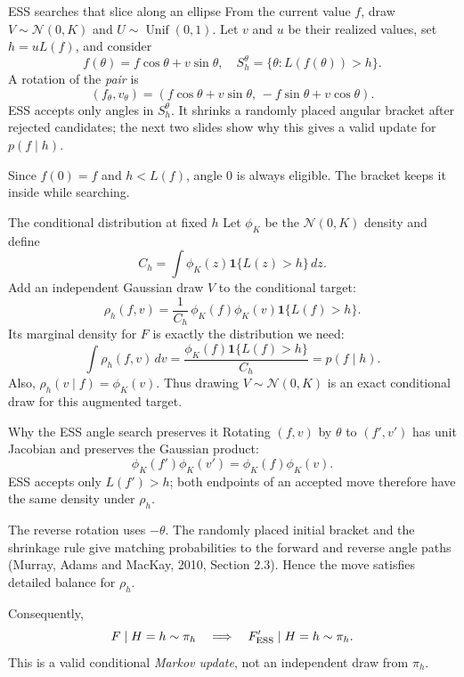 \documentclass[aspectratio=169,11pt]{beamer}
\begin{document}
\begin{frame}{ESS searches that slice along an ellipse}
  From the current value \(f\), draw \(V\sim\mathcal N(0,K)\)
  and \(U\sim \operatorname{Unif}(0,1)\).
  Let \(v\) and \(u\) be their realized values, set \(h=uL(f)\),
  and consider
  \[
    f(\theta)=f\cos\theta+v\sin\theta,\quad
    S_h^\theta=\{\theta:L(f(\theta))>h\}.
  \]
  A rotation of the \emph{pair} is
  \[
    (f_\theta,v_\theta)
      =(f\cos\theta+v\sin\theta,\,
        -f\sin\theta+v\cos\theta).
  \]
  ESS accepts only angles in \(S_h^\theta\). It shrinks a
  randomly placed angular bracket after rejected candidates;
  the next two slides show why this gives a valid update for
  \(p(f\mid h)\).
  \vspace{0.35em}

  Since \(f(0)=f\) and \(h<L(f)\), angle \(0\) is always eligible.
  The bracket keeps it inside while searching.
\end{frame}

\begin{frame}{The conditional distribution at fixed \(h\)}
  Let \(\phi_K\) be the \(\mathcal N(0,K)\) density and define
  \[
    C_h=\int \phi_K(z)\mathbf 1\{L(z)>h\}\,dz.
  \]
  Add an independent Gaussian draw \(V\) to the conditional target:
  \[
    \rho_h(f,v)
      =\frac{1}{C_h}\,
       \phi_K(f)\phi_K(v)\mathbf 1\{L(f)>h\}.
  \]
  Its marginal density for \(F\) is exactly the distribution we need:
  \[
    \int \rho_h(f,v)\,dv
      =\frac{\phi_K(f)\mathbf 1\{L(f)>h\}}{C_h}
      =p(f\mid h).
  \]
  Also, \(\rho_h(v\mid f)=\phi_K(v)\). Thus drawing
  \(V\sim\mathcal N(0,K)\) is an exact conditional draw for this
  augmented target.
\end{frame}

\begin{frame}{Why the ESS angle search preserves it}
  Rotating \((f,v)\) by \(\theta\) to \((f',v')\) has unit
  Jacobian and preserves the Gaussian product:
  \[
    \phi_K(f')\phi_K(v')=\phi_K(f)\phi_K(v).
  \]
  ESS accepts only \(L(f')>h\); both endpoints of an accepted
  move therefore have the same density under \(\rho_h\).
  \vspace{0.3em}

  The reverse rotation uses \(-\theta\). The randomly placed
  initial bracket and the shrinkage rule give matching
  probabilities to the forward and reverse angle paths
  (Murray, Adams and MacKay, 2010, Section 2.3).
  Hence the move satisfies detailed balance for \(\rho_h\).
  \vspace{0.35em}

  \alert{Consequently,}
  \[
    F\mid H=h\sim\pi_h
      \quad\Longrightarrow\quad
    F'_{\rm ESS}\mid H=h\sim\pi_h.
  \]
  This is a valid conditional \emph{Markov update}, not an
  independent draw from \(\pi_h\).
\end{frame}
\end{document}
